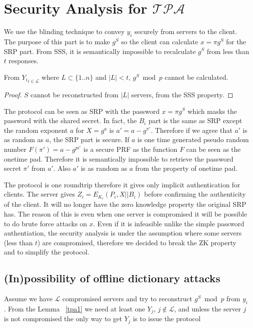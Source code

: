 \section{Security Analysis for $\mathcal{TPA}$}
We use the blinding technique to convey $y_i$ securely from servers to
the client. The purpose of this part is to make $g^S$ so the client
can calculate $x = \pi g^S$ for the SRP part. From SSS, it is
semantically impossible to recalculate $g^S$ from less than $t$
responses.

\begin{lemma}
\label{tpa1}
From ${Y_i}_{i \in \mathcal{L}}$ where $L \subset \{1..n\}$ and $|L| <
t$, $g^S \bmod p$ cannot be calculated.
\end{lemma}

\begin{proof}
$S$ cannot be reconstructed from $|L|$ servers, from the SSS
  property.
\end{proof}

The protocol can be seen as SRP with the password $x = \pi g^S$ which
masks the password with the shared secret. In fact, the $B_i$ part is
the same as SRP except the random exponent $a$ for $X = g^a$ is $a' =
a - g^{\pi'}$. Therefore if we agree that $a'$ is as random as $a$,
the SRP part is secure. If $a$ is one time generated pseudo random
number $F(\pi') = a - g^{pi'}$ is a secure PRF as the function $F$ can
be seen as the onetime pad. Therefore it is semantically impossible to
retrieve the password secret $\pi'$ from $a'$. Also $a'$ is as random
as $a$ from the property of onetime pad.

The protocol is one roundtrip therefore it gives only implicit
authentication for clients. The server gives $Z_i = E_{K_i}(P_i,
X||B_i)$ before confirming the authenticity of the client. It will 
no longer have the zero knowledge property the original SRP has. The
reason of this is even when one server is compromised it will be
possible to do brute force attacks on $x$. Even if it is
infeasible unlike the simple password authentiation, the security
analysis is under the assumption where some servers (less than $t$)
are compromised, therefore we decided to break the ZK property and to
simplify the protocol.

\subsection{(In)possibility of offline dictionary attacks}
Assume we have $\mathcal{L}$ compromised servers and try to reconstruct $g^S
\bmod p$ from ${y_i}$. From the Lemma ~\ref{tpa1} we need at least one
$Y_j$, $j \notin \mathcal{L}$, and unless the server $j$ is not
compromised the only way to get $Y_j$ is to issue the protocol
